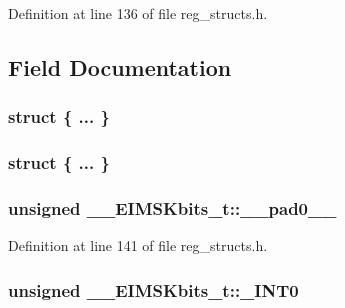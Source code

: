 Definition at line 136 of file reg\+\_\+structs.\+h.



\subsection{Field Documentation}
\hypertarget{union_____e_i_m_s_kbits__t_a96f7a49c707e180206b03a07c5640e4b}{\subsubsection[{"@29}]{\setlength{\rightskip}{0pt plus 5cm}struct \{ ... \} }}\label{union_____e_i_m_s_kbits__t_a96f7a49c707e180206b03a07c5640e4b}
\hypertarget{union_____e_i_m_s_kbits__t_a270d013eb44e647c1e66a17e89a59e4b}{\subsubsection[{"@31}]{\setlength{\rightskip}{0pt plus 5cm}struct \{ ... \} }}\label{union_____e_i_m_s_kbits__t_a270d013eb44e647c1e66a17e89a59e4b}
\hypertarget{union_____e_i_m_s_kbits__t_a2cd268092abd4e5492b53adf574f6207}{
\subsubsection[{\+\_\+\+\_\+pad0\+\_\+\+\_\+}]{\setlength{\rightskip}{0pt plus 5cm}unsigned \+\_\+\+\_\+\+E\+I\+M\+S\+Kbits\+\_\+t\+::\+\_\+\+\_\+pad0\+\_\+\+\_\+}}\label{union_____e_i_m_s_kbits__t_a2cd268092abd4e5492b53adf574f6207}


Definition at line 141 of file reg\+\_\+structs.\+h.

\hypertarget{union_____e_i_m_s_kbits__t_a5542937570bc5a41fcdc76222207b6e8}{
\subsubsection[{\+\_\+\+I\+N\+T0}]{\setlength{\rightskip}{0pt plus 5cm}unsigned \+\_\+\+\_\+\+E\+I\+M\+S\+Kbits\+\_\+t\+::\+\_\+\+I\+N\+T0}}\label{union_____e_i_m_s_kbits__t_a5542937570bc5a41fcdc76222207b6e8}


